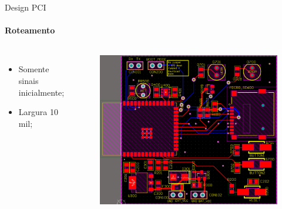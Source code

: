 \begin{frame}{Design PCI}
{    \framesubtitle{{Roteamento}}

    \begin{columns}
        
        \centering
        \begin{itemize}
            \item Somente sinais inicialmente;
            \item Largura 10 mil;
        \end{itemize}
        
        \begin{figure}
            \centering
            \includegraphics[width=\linewidth]{figuras/cap3/pcb/pcb_signlas_route.png}
        \end{figure}


    \end{columns}
    }

\end{frame}
